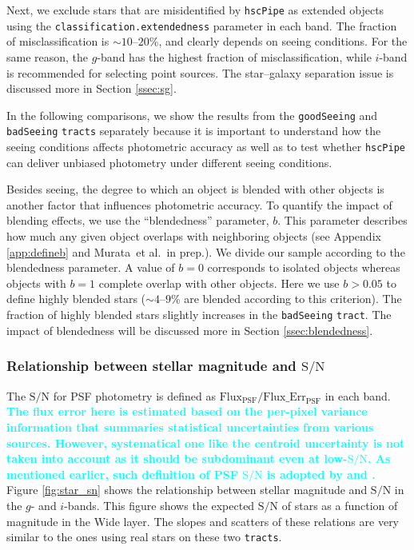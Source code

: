 \documentclass[useamsfonts]{pasj01}
\def\etal{{\ et al.~}}
\def\hscpipe{\texttt{hscPipe}}
\def\tract{\texttt{tract}}
\def\tracts{\texttt{tracts}}
\def\s2n{{$\mathrm{S}/\mathrm{N}$}}
\newcommand{\song}[1]{\textcolor{cyan} {\textbf{#1}}}
\begin{document}
    Next, we exclude stars that are misidentified by \hscpipe{} as extended
    objects using the \texttt{classification.extendedness} parameter in each band.
    The fraction of misclassification is ${\sim}10$--$20$\%, and clearly depends on
    seeing conditions.
    For the same reason, the $g$-band has the highest fraction of misclassification,
    while $i$-band is recommended for selecting point sources.
    The star--galaxy separation issue is discussed more in Section \ref{ssec:sg}.

    In the following comparisons, we show the results from the
    \texttt{goodSeeing} and \texttt{badSeeing} \tracts{} separately because it
    is important to understand how the seeing conditions affects photometric accuracy 
    as well as to test whether \hscpipe{} can deliver unbiased photometry under 
    different seeing conditions.
    
    Besides seeing, the degree to which an object is blended with other objects 
    is another factor that influences photometric accuracy. 
    To quantify the impact of blending effects, we use the ``blendedness'' 
    parameter, $b$. 
    This parameter describes how much any given object overlaps with neighboring 
    objects (see Appendix \ref{app:defineb} and Murata\etal in prep.). 
    We divide our sample according to the blendedness parameter. 
    A value of $b=0$ corresponds to isolated objects whereas objects with $b=1$ 
    complete overlap with other objects. 
    Here we use $b>0.05$ to define highly blended stars (${\sim}4$--$9$\% are blended
    according to this criterion).
    The fraction of highly blended stars slightly increases in the \texttt{badSeeing} 
    \tract{}. 
    The impact of blendedness will be discussed more in Section \ref{ssec:blendedness}.

\subsubsection{Relationship between stellar magnitude and \s2n{}}

    The \s2n{} for PSF photometry is defined as
    $\mathrm{Flux}_{\mathrm{PSF}}/\mathrm{Flux\_Err}_{\mathrm{PSF}}$ in each band. 
    \song{
    The flux error here is estimated based on the per-pixel variance information that
    summaries statistical uncertainties from various sources. 
    However, systematical one like the centroid uncertainty is not taken into account 
    as it should be subdominant even at low-\s2n{}. 
    As mentioned earlier, such definition of PSF \s2n{} is adopted by \citet{HSCDR1} 
    and \citet{Bosch2017}.
    }
    Figure \ref{fig:star_sn} shows the relationship between stellar magnitude and \s2n{} 
    in the $g$- and $i$-bands. 
    This figure shows the expected \s2n{} of stars as a function of magnitude in the 
    Wide layer.
    The slopes and scatters of these relations are very similar to the ones using 
    real stars on these two \tracts{}.
    
\end{document}
